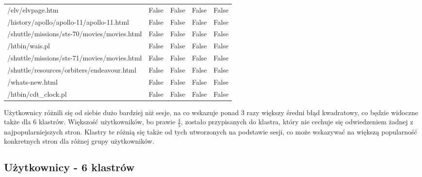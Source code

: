 \documentclass{classrep}
\begin{document}
\begin{table}[H]
{\begin{tabular}{@{}lcccc@{}}
    /elv/elvpage.htm & False & False & False & False \\
    /history/apollo/apollo-11/apollo-11.html & False & False & False & False \\
    /shuttle/missions/sts-70/movies/movies.html & False & False & False & False \\
    /htbin/wais.pl & False & False & False & False \\
    /shuttle/missions/sts-71/movies/movies.html & False & False & False & False \\
    /shuttle/resources/orbiters/endeavour.html & False & False & False & False \\
    /whats-new.html & False & False & False & False \\
    /htbin/cdt\_clock.pl & False & False & False & False \\ \bottomrule
    \end{tabular}%
    }
    \end{table}
    
    \begin{table}[H]
    \centering
    \caption{Przypisanie obserwacji dla 3 klastrów z flagami stron podczas analizy użytkowników}
    \label{tab:usr_3clusters_sum_pages}
    \end{table}
    
    Użytkownicy różnili się od siebie dużo bardziej niż sesje, na co wskazuje ponad 3 razy większy średni błąd kwadratowy, co będzie widoczne także dla 6 klastrów. Większość użytkowników, bo prawie \( \frac{4}{5} \), zostało przypisanych do klastra, który nie cechuje się odwiedzeniem żadnej z najpopularniejszych stron. Klastry te różnią się także od tych utworzonych na podstawie sesji, co może wskazywać na większą popularność konkretnych stron dla różnej grupy użytkowników. 
    
    \subsection{Użytkownicy - 6 klastrów}
\end{document}
